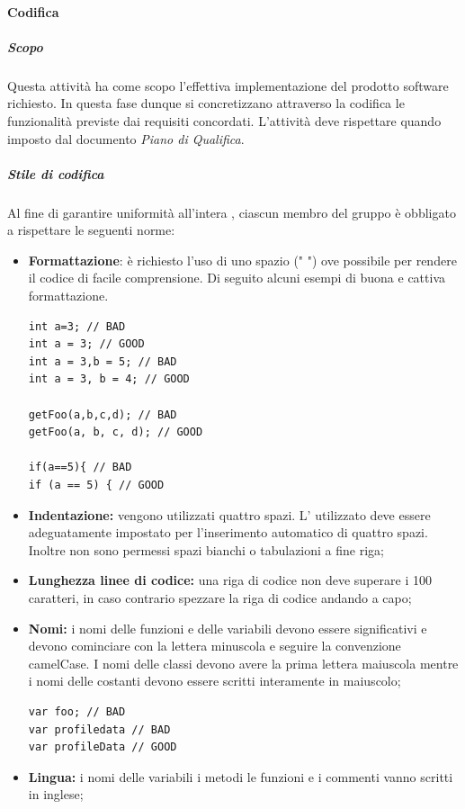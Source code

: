 		\paragraph{Codifica}
			\subparagraph{Scopo} \Spazio
			Questa attività ha come scopo l'effettiva implementazione del prodotto software richiesto. In questa fase dunque si concretizzano attraverso la codifica le funzionalità previste dai requisiti concordati.
			L'attività deve rispettare quando imposto dal documento \textit{Piano di Qualifica}.
			\subparagraph{Stile di codifica} \Spazio
			Al fine di garantire uniformità all'intera , ciascun membro del gruppo è obbligato a rispettare le seguenti norme:
			\begin{itemize}
			\item \textbf{Formattazione}: è richiesto l'uso di uno spazio (" ") ove possibile per rendere il codice di facile comprensione.
			Di seguito alcuni  esempi di buona e cattiva formattazione.
\begin{lstlisting}
int a=3; // BAD
int a = 3; // GOOD
int a = 3,b = 5; // BAD
int a = 3, b = 4; // GOOD

getFoo(a,b,c,d); // BAD
getFoo(a, b, c, d); // GOOD

if(a==5){ // BAD
if (a == 5) { // GOOD
\end{lstlisting}
			
			\item \textbf{Indentazione:} vengono utilizzati quattro spazi. L' utilizzato deve essere adeguatamente impostato per l'inserimento automatico di quattro spazi. Inoltre non sono permessi spazi bianchi o tabulazioni a fine riga;
			
			\item \textbf{Lunghezza linee di codice:} una riga di codice non deve superare i 100 caratteri, in caso contrario spezzare la riga di codice andando a capo;
			
			\item \textbf{Nomi:} i nomi delle funzioni e delle variabili devono essere significativi e devono cominciare con la lettera minuscola e seguire la convenzione camelCase. I nomi delle classi devono avere la prima lettera maiuscola mentre i nomi delle costanti devono essere scritti interamente in maiuscolo;
\begin{lstlisting}
var foo; // BAD
var profiledata // BAD
var profileData // GOOD
\end{lstlisting}
			
			\item \textbf{Lingua:} i nomi delle variabili i metodi le funzioni e i commenti vanno scritti in inglese;
			

\end{itemize}
